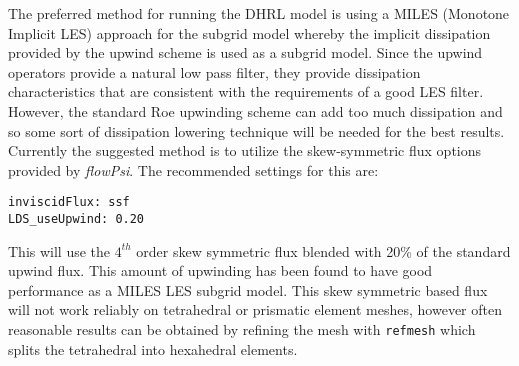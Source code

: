 The preferred method for running the DHRL model is using a MILES
(Monotone Implicit LES) approach for the subgrid model whereby the
implicit dissipation provided by the upwind scheme is used as a
subgrid model. Since the upwind operators provide a natural low pass
filter, they provide dissipation characteristics that are consistent
with the requirements of a good LES filter.  However, the standard Roe
upwinding scheme can add too much dissipation and so some sort of
dissipation lowering technique will be needed for the best results.
Currently the suggested method is to utilize the skew-symmetric flux
options provided by {\it flowPsi}.  The recommended settings for this are:

\begin{verbatim}
inviscidFlux: ssf
LDS_useUpwind: 0.20
\end{verbatim}

This will use the $4^{th}$ order skew symmetric flux blended with 20\%
of the standard upwind flux.  This amount of upwinding has been found
to have good performance as a MILES LES subgrid model.  This skew
symmetric based flux will not work reliably on tetrahedral or
prismatic element meshes, however often reasonable results can be
obtained by refining the mesh with {\tt refmesh} which splits the
tetrahedral into hexahedral elements.


